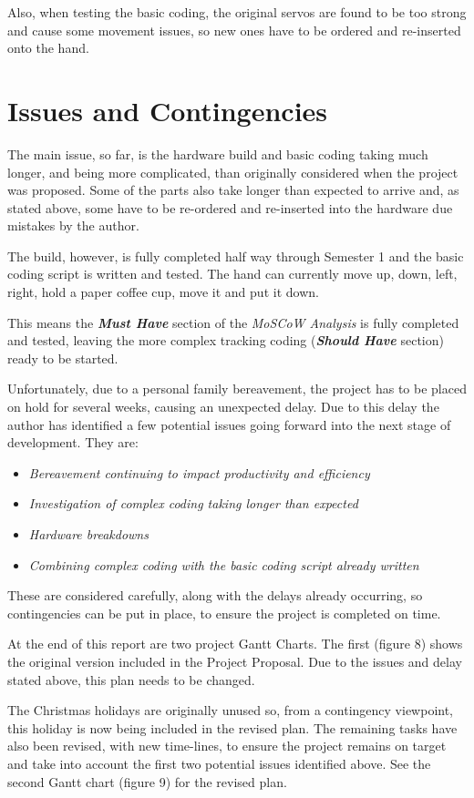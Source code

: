 \documentclass[progress]{cmpreport}
\begin{document}
Also, when testing the basic coding, the original servos are found to be too strong and cause some movement issues, so new ones have to be ordered and re-inserted onto the hand. 

\section{Issues and Contingencies}
The main issue, so far, is the hardware build and basic coding taking much longer, and being more complicated, than originally considered when the project was proposed. Some of the parts also take longer than expected to arrive and, as stated above, some have to be re-ordered and re-inserted into the hardware due mistakes by the author. 

The build, however, is fully completed half way through Semester 1 and the basic coding script is written and tested. The hand can currently move up, down, left, right, hold a paper coffee cup, move it and put it down. 

This means the \textbf{\textit{Must Have}} section of the \textit{MoSCoW Analysis} is fully completed and tested, leaving the more complex tracking coding  (\textbf{\textit{Should Have}} section) ready to be started. 

Unfortunately, due to a personal family bereavement, the project has to be placed on hold for several weeks, causing an unexpected delay. Due to this delay the author has identified a few potential issues going forward into the next stage of development. They are:
\begin{itemize}		
	\item \textit{Bereavement continuing to impact productivity and efficiency}
	\item \textit{Investigation of complex coding taking longer than expected}
	\item \textit{Hardware breakdowns}
	\item \textit{Combining complex coding with the basic coding script already written}
\end{itemize}
These are considered carefully, along with the delays already occurring, so contingencies can be put in place, to ensure the project  is completed on time. 

At the end of this report are two project Gantt Charts. The first (figure 8) shows the original version included in the Project Proposal. Due to the issues and delay stated above, this plan needs to be changed. 

The Christmas holidays are originally unused so, from a contingency viewpoint, this holiday is now being included in the revised plan. The remaining tasks have also been revised, with new time-lines, to ensure the project remains on target and take into account the first two potential issues identified above. See the second Gantt chart (figure 9) for the revised plan. 
\end{document}
